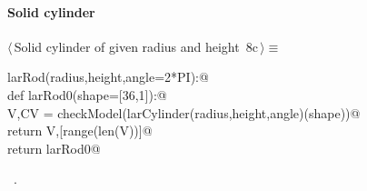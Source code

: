 \documentclass[11pt,oneside]{article}	%
\begin{document}
\paragraph{Solid cylinder}
\begin{flushleft} \small \label{scrap15}
\protect{}$\langle\,$Solid cylinder of given radius and height\nobreak\ {\footnotesize 8c}$\,\rangle\equiv$
\vspace{-1ex}
\begin{list}{}{} \item
\mbox{}\verb@def larRod(radius,height,angle=2*PI):@\\
\mbox{}\verb@   def larRod0(shape=[36,1]):@\\
\mbox{}\verb@      V,CV = checkModel(larCylinder(radius,height,angle)(shape))@\\
\mbox{}\verb@      return V,[range(len(V))]@\\
\mbox{}\verb@   return larRod0@\\
\mbox{}\verb@@{\NWsep}
\end{list}
\vspace{-1ex}
\footnotesize\addtolength{\baselineskip}{-1ex}
\begin{list}{}{\setlength{\itemsep}{-\parsep}\setlength{\itemindent}{-\leftmargin}}
\item \NWtxtMacroRefIn\ .
\end{list}
\end{flushleft}
\end{document}
